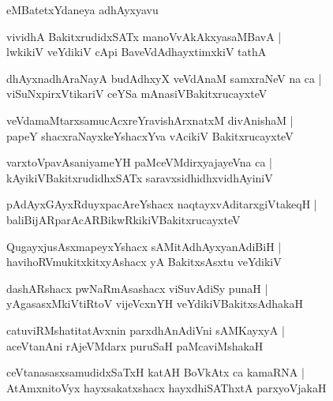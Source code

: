 \documentclass[twoside,12pt,openright]{book}
\newcounter{shloka}[chapter]
\begin{document}
\begin{center}
eMBatetxYdaneya adhAyxyavu 
\end{center}

\begin{shloka}%
vividhA BakitxrudidxSATx manoVvAkAkxyasaMBavA |\\
lwkikiV veYdikiV cApi BaveVdAdhayxtimxkiV tathA 
\end{shloka}

\begin{shloka}%
dhAyxnadhAraNayA budAdhxyX veVdAnaM samxraNeV na ca |\\
viSuNxpirxVtikariV ceYSa mAnasiVBakitxrucayxteV 
\end{shloka}

\begin{shloka}%
veVdamaMtarxsamucAcxreYravishArxnatxM divAnishaM |\\
papeY shacxraNayxkeYshacxYva vAcikiV BakitxrucayxteV
\end{shloka}

\begin{shloka}%
varxtoVpavAsaniyameYH paMceVMdirxyajayeVna ca |\\
kAyikiVBakitxrudidhxSATx saravxsidhidhxvidhAyiniV 
\end{shloka}

\begin{shloka}%
pAdAyxGAyxRduyxpacAreYshacx naqtayxvAditarxgiVtakeqH |\\
baliBijARparAcARBikwRkikiVBakitxrucayxteV 
\end{shloka}

\begin{shloka}%
QugayxjusAsxmapeyxYshacx sAMitAdhAyxyanAdiBiH |\\
havihoRVmukitxkitxyAshacx yA BakitxsAsxtu veYdikiV 
\end{shloka}

\begin{shloka}%
dashARshacx pwNaRmAsashacx viSuvAdiSy punaH |\\
yAgasasxMkiVtiRtoV vijeVcxnYH veYdikiVBakitxsAdhakaH 
\end{shloka}

\begin{shloka}%
catuviRMshatitatAvxnin parxdhAnAdiVni sAMKayxyA |\\
aceVtanAni rAjeVMdarx puruSaH paMcaviMshakaH 
\end{shloka}

\begin{shloka}%
ceVtanasasxsamudidxSaTxH katAH BoVkAtx ca kamaRNA |\\
AtAmxnitoVyx hayxsakatxshacx hayxdhiSAThxtA parxyoVjakaH
\end{shloka}
\end{document}
